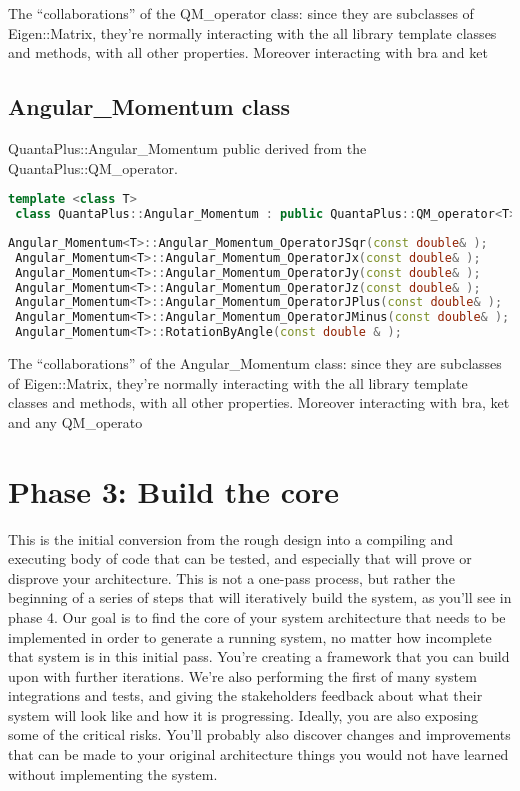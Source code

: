 \documentclass[10pt,a4paper]{article}
\begin{document}
The “collaborations” of the QM\_operator class: since they are subclasses of Eigen::Matrix, they're normally interacting with the all  library template classes and methods, with all other properties. Moreover interacting with bra and ket 
\subsection{Angular\_Momentum class}
QuantaPlus::Angular\_Momentum public derived from the QuantaPlus::QM\_operator.
\begin{lstlisting}[language=c++, caption= Angular\_Momentum class]
 template <class T> 
 class QuantaPlus::Angular_Momentum : public QuantaPlus::QM_operator<T> 
\end{lstlisting}
\begin{lstlisting}[language=c++, caption= Angular\_Momentum public methods]
 Angular_Momentum<T>::Angular_Momentum_OperatorJSqr(const double& );
 Angular_Momentum<T>::Angular_Momentum_OperatorJx(const double& );
 Angular_Momentum<T>::Angular_Momentum_OperatorJy(const double& );
 Angular_Momentum<T>::Angular_Momentum_OperatorJz(const double& );
 Angular_Momentum<T>::Angular_Momentum_OperatorJPlus(const double& );
 Angular_Momentum<T>::Angular_Momentum_OperatorJMinus(const double& );
 Angular_Momentum<T>::RotationByAngle(const double & );
\end{lstlisting}

The “collaborations” of the Angular\_Momentum class: since they are subclasses of Eigen::Matrix, they're normally interacting with the all  library template classes and methods, with all other properties. Moreover interacting with bra, ket and any QM\_operato 

\section{Phase 3: Build the core}
This is the initial conversion from the rough design into a compiling and executing body of code that can be tested, and especially that will prove or disprove your architecture. This is not a one-pass process, but rather the beginning of a series of steps that will iteratively build the system, as you’ll see in phase 4.
Our goal is to find the core of your system architecture that needs to be implemented in order to generate a running system, no matter how incomplete that system is in this initial pass. You’re creating a framework that you can build upon with further iterations. We’re also performing the first of many system integrations and tests, and
giving the stakeholders feedback about what their system will look like and how it is progressing. Ideally, you are also exposing some of the critical risks. You’ll probably also discover changes and
improvements that can be made to your original architecture things you would not have learned without implementing the system.
\end{document}
